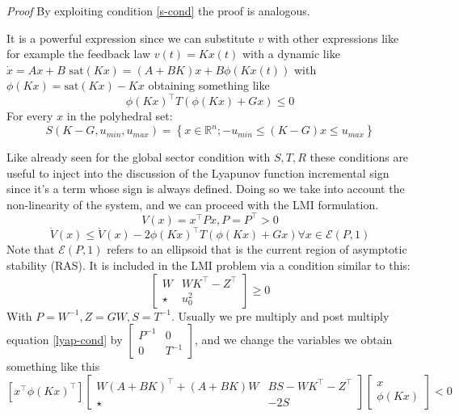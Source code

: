 \documentclass[12pt]{article}
\begin{document}
\textit{Proof} By exploiting condition \ref{s-cond} the proof is analogous.

It is a powerful expression since we can substitute $v$ with other expressions like for example the feedback law $v(t) = K x(t)$ with a dynamic like $\dot x = A x + B \text{ sat}(K x) = (A + BK) x + B \phi(K x(t))$ with $\phi(K x) = \text{sat} (K x) - Kx$ obtaining something like
$$
  \phi(Kx)^{\top} T \left( \phi(Kx) + Gx \right) \leq 0
$$
For every $x$ in the polyhedral set:
$$
S(K - G, u_{min}, u_{max}) = \left\{ x \in \mathbb{R}^n; -u_{min} \leq \left( K - G \right) x \leq u_{max}\right\}
$$

Like already seen for the global sector condition with $S, T, R$ these conditions are useful to inject into the discussion of the Lyapunov function incremental sign since it's a term whose sign is always defined. Doing so we take into account the non-linearity of the system, and we can proceed with the LMI formulation.
$$
  V(x) = x^{\top} P x, P = P^{\top} > 0
$$
\begin{equation} \label{lyap-cond}
  \dot V (x) \leq \dot V (x) - 2 \phi(K x)^{\top} T (\phi(K x) + G x) \forall x \in \mathcal{E}(P, 1)
\end{equation}
Note that $\mathcal{E}(P, 1)$ refers to an ellipsoid that is the current region of asymptotic stability (RAS). It is included in the LMI problem via a condition similar to this:
\begin{equation}
  \begin{bmatrix}
    W & W K^{\top} - Z^{\top}\\
    \star & u_{0}^2
  \end{bmatrix} \geq 0
\end{equation}
With $ P = W^{-1}, Z = GW, S = T^{-1}$. Usually we pre multiply and post multiply equation \ref{lyap-cond} by $\begin{bmatrix}
  P^{-1} & 0\\
  0 & T^{-1}
\end{bmatrix}$, and we change the variables we obtain something like this
$$
  \left[ x^{\top} \phi(K x)^{\top} \right] \begin{bmatrix}
    W(A + BK)^{\top} + (A + BK) W & BS-WK^{\top} - Z^{\top}\\
    \star & - 2S
  \end{bmatrix} \begin{bmatrix}
    x\\
    \phi(Kx)
  \end{bmatrix} < 0
$$
\end{document}
